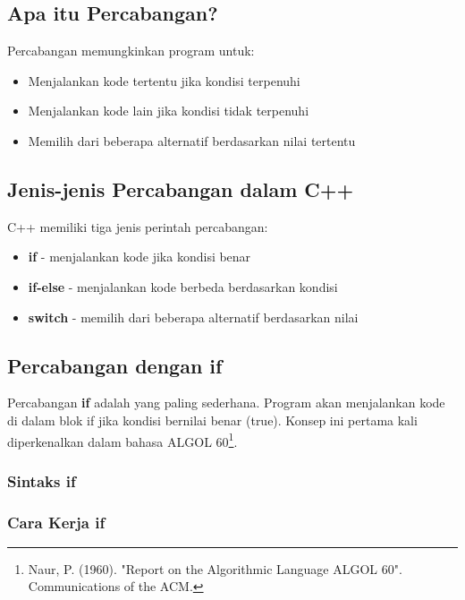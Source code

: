 \subsection{Apa itu Percabangan?}

Percabangan memungkinkan program untuk:
\begin{itemize}
\item Menjalankan kode tertentu jika kondisi terpenuhi
\item Menjalankan kode lain jika kondisi tidak terpenuhi
\item Memilih dari beberapa alternatif berdasarkan nilai tertentu
\end{itemize}

\subsection{Jenis-jenis Percabangan dalam C++}

C++ memiliki tiga jenis perintah percabangan:
\begin{itemize}
\item \textbf{if} - menjalankan kode jika kondisi benar
\item \textbf{if-else} - menjalankan kode berbeda berdasarkan kondisi
\item \textbf{switch} - memilih dari beberapa alternatif berdasarkan nilai
\end{itemize}

\subsection{Percabangan dengan if}\label{percabangan-dengan-if}

Percabangan \textbf{if} adalah yang paling sederhana. Program akan menjalankan kode di dalam blok if jika kondisi bernilai benar (true). Konsep ini pertama kali diperkenalkan dalam bahasa ALGOL 60\footnote{Naur, P. (1960). "Report on the Algorithmic Language ALGOL 60". Communications of the ACM.}.

\subsubsection{Sintaks if}



\subsubsection{Cara Kerja if}

